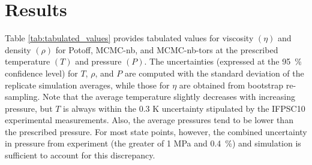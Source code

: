 \documentclass[preprint,review,12pt]{elsarticle}
\begin{document}
		
	\section{Results} \label{Results}    
	
	Table \ref{tab:tabulated_values} provides tabulated values for viscosity $(\eta)$ and density $(\rho)$ for Potoff, MCMC-nb, and MCMC-nb-tors at the prescribed temperature $(T)$ and pressure $(P)$. The uncertainties (expressed at the 95~\% confidence level) for $T$, $\rho$, and $P$ are computed with the standard deviation of the replicate simulation averages, while those for $\eta$ are obtained from bootstrap re-sampling. Note that the average temperature slightly decreases with increasing pressure, but $T$ is always within the 0.3 K uncertainty stipulated by the IFPSC10 experimental measurements. Also, the average pressures tend to be lower than the prescribed pressure. For most state points, however, the combined uncertainty in pressure from experiment (the greater of 1 MPa and 0.4~\%) and simulation is sufficient to account for this discrepancy. 
	
\end{document}
